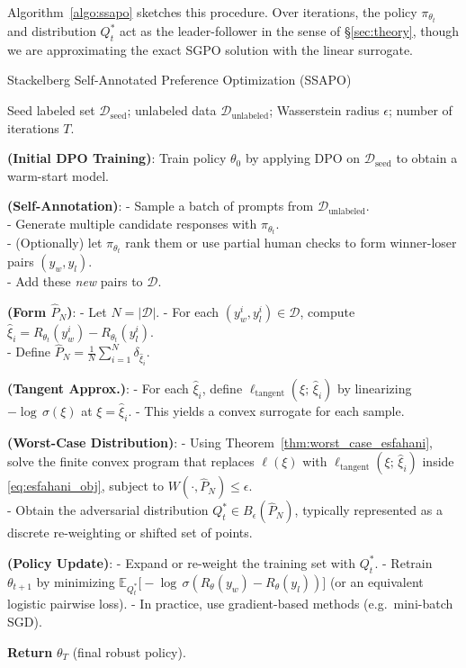 Algorithm~\ref{algo:ssapo} sketches this procedure.  Over iterations, 
the policy $\pi_{\theta_t}$ and distribution $Q^*_t$ act as the leader-follower 
in the sense of \S\ref{sec:theory}, though we are approximating the exact 
SGPO solution with the linear surrogate.  

\begin{algorithm}[t!]
\caption{Stackelberg Self-Annotated Preference Optimization (SSAPO)}
\label{algo:ssapo}
\begin{algorithmic}[1]
\REQUIRE 
  Seed labeled set $\mathcal{D}_{\mathrm{seed}}$; 
  unlabeled data $\mathcal{D}_{\mathrm{unlabeled}}$; 
  Wasserstein radius $\epsilon$; 
  number of iterations $T$.

\STATE \textbf{(Initial DPO Training)}: 
   Train policy $\theta_0$ by applying DPO on $\mathcal{D}_{\mathrm{seed}}$ 
   to obtain a warm-start model.

    \STATE \textbf{(Self-Annotation)}: 
      - Sample a batch of prompts from $\mathcal{D}_{\mathrm{unlabeled}}$. \\
      - Generate multiple candidate responses with $\pi_{\theta_t}$. \\
      - (Optionally) let $\pi_{\theta_t}$ rank them or use partial human checks to form winner-loser pairs $(y_w,y_l)$. \\
      - Add these \emph{new} pairs to $\mathcal{D}$.

    \STATE \textbf{(Form $\hat{P}_N$)}: 
      - Let $N=|\mathcal{D}|$.  
      - For each $(y_w^i,y_l^i)\in \mathcal{D}$, compute 
        $\hat{\xi}_i = R_{\theta_t}(y_w^i)-R_{\theta_t}(y_l^i)$. \\
      - Define $\hat{P}_N=\frac{1}{N}\sum_{i=1}^N \delta_{\hat{\xi}_i}$.

    \STATE \textbf{(Tangent Approx.)}:
      - For each $\hat{\xi}_i$, define $\ell_{\mathrm{tangent}}(\xi;\,\hat{\xi}_i)$ by linearizing $-\!\log\,\sigma(\xi)$ at $\xi=\hat{\xi}_i$.  
      - This yields a convex surrogate for each sample.

    \STATE \textbf{(Worst-Case Distribution)}:
      - Using Theorem~\ref{thm:worst_case_esfahani}, solve the finite convex program that replaces $\ell(\xi)$ with $\ell_{\mathrm{tangent}}(\xi;\,\hat{\xi}_i)$ inside \eqref{eq:esfahani_obj}, subject to $W(\cdot,\hat{P}_N)\le \epsilon$. \\
      - Obtain the adversarial distribution $Q^*_t \in B_\epsilon(\hat{P}_N)$, typically represented as a discrete re-weighting or shifted set of points.

    \STATE \textbf{(Policy Update)}:
      - Expand or re-weight the training set with $Q^*_t$.  
      - Retrain $\theta_{t+1}$ by minimizing 
        $\mathbb{E}_{Q^*_t}\!\bigl[-\!\log\,\sigma(R_{\theta}(y_w)-R_{\theta}(y_l))\bigr]$ 
        (or an equivalent logistic pairwise loss).  
      - In practice, use gradient-based methods (e.g.\ mini-batch SGD).

\ENDFOR

\STATE \textbf{Return} $\theta_T$ (final robust policy).
\end{algorithmic}
\end{algorithm}


